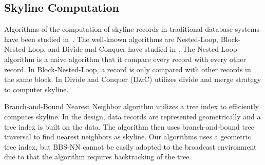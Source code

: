 
\subsection{Skyline Computation}

Algorithms of the computation of skyline records in traditional database systems have been studied in~\cite{conf/icde/BorzsonyiKS01,shooting_stars,progressive_skyline}. The well-known algorithms are Nested-Loop, Block-Nested-Loop, and Divide and Conquer have studied in \cite{conf/icde/BorzsonyiKS01}. The Nested-Loop algorithm is a naive algorithm that it compare every record with every other record. In Block-Nested-Loop, a record is only compared with other records in the same block. In Divide and Conquer (D\&C) utilizes divide and merge strategy to computer skyline.


Branch-and-Bound Nearest Neighbor \cite{progressive_skyline} algorithm utilizes a tree index to efficiently computes skyline. In the design, data records are represented geometrically and a tree index is built on the data. The algorithm then uses branch-and-bound tree traversal to find nearest neighbors as skyline. Our algorithms uses a geometric tree index, but BBS-NN cannot be easily adopted to the broadcast environment due to that the algorithm requires backtracking of the tree.


